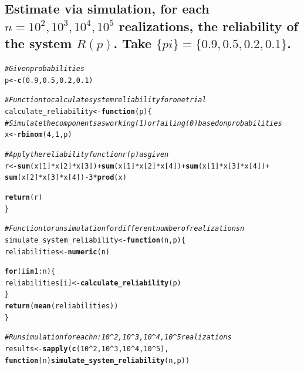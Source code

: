 \documentclass[12pt]{article}\usepackage[]{graphicx}\usepackage[]{xcolor}
\makeatletter
\newcommand{\hlnum}[1]{\textcolor[rgb]{0.686,0.059,0.569}{#1}}%
\newcommand{\hlcom}[1]{\textcolor[rgb]{0.678,0.584,0.686}{\textit{#1}}}%
\newcommand{\hlopt}[1]{\textcolor[rgb]{0,0,0}{#1}}%
\newcommand{\hldef}[1]{\textcolor[rgb]{0.345,0.345,0.345}{#1}}%
\newcommand{\hlkwa}[1]{\textcolor[rgb]{0.161,0.373,0.58}{\textbf{#1}}}%
\newcommand{\hlkwb}[1]{\textcolor[rgb]{0.69,0.353,0.396}{#1}}%
\newcommand{\hlkwc}[1]{\textcolor[rgb]{0.333,0.667,0.333}{#1}}%
\newcommand{\hlkwd}[1]{\textcolor[rgb]{0.737,0.353,0.396}{\textbf{#1}}}%
\newenvironment{kframe}{%
 \def\at@end@of@kframe{}%
 \ifinner\ifhmode%
  \def\at@end@of@kframe{\end{minipage}}%
  \begin{minipage}{\columnwidth}%
 \fi\fi%
 \def\FrameCommand##1{\hskip\@totalleftmargin \hskip-\fboxsep
 \colorbox{shadecolor}{##1}\hskip-\fboxsep
     \hskip-\linewidth \hskip-\@totalleftmargin \hskip\columnwidth}%
 \MakeFramed {\advance\hsize-\width
   \@totalleftmargin\z@ \linewidth\hsize
   \@setminipage}}%
 {\par\unskip\endMakeFramed%
 \at@end@of@kframe}
\newenvironment{knitrout}{}{} %
\makeatother
\begin{document}
\subsection{Estimate via simulation, for each $n = 10^{2} , 10^{3} , 10^{4} , 10^{5}$ realizations, the reliability of the system $R(p)$. Take $\{pi \} = \{0.9, 0.5, 0.2, 0.1\}$.}
\begin{knitrout}
\color{fgcolor}\begin{kframe}
\begin{alltt}
\hlcom{# Given probabilities}
\hldef{p} \hlkwb{<-} \hlkwd{c}\hldef{(}\hlnum{0.9}\hldef{,} \hlnum{0.5}\hldef{,} \hlnum{0.2}\hldef{,} \hlnum{0.1}\hldef{)}

\hlcom{# Function to calculate system reliability for one trial}
\hldef{calculate_reliability} \hlkwb{<-} \hlkwa{function}\hldef{(}\hlkwc{p}\hldef{) \{}
  \hlcom{# Simulate the components as working (1) or failing (0) based on probabilities}
  \hldef{x} \hlkwb{<-} \hlkwd{rbinom}\hldef{(}\hlnum{4}\hldef{,} \hlnum{1}\hldef{, p)}

  \hlcom{# Apply the reliability function r(p) as given}
  \hldef{r} \hlkwb{<-} \hlkwd{sum}\hldef{(x[}\hlnum{1}\hldef{]}\hlopt{*}\hldef{x[}\hlnum{2}\hldef{]}\hlopt{*}\hldef{x[}\hlnum{3}\hldef{])} \hlopt{+} \hlkwd{sum}\hldef{(x[}\hlnum{1}\hldef{]}\hlopt{*}\hldef{x[}\hlnum{2}\hldef{]}\hlopt{*}\hldef{x[}\hlnum{4}\hldef{])} \hlopt{+} \hlkwd{sum}\hldef{(x[}\hlnum{1}\hldef{]}\hlopt{*}\hldef{x[}\hlnum{3}\hldef{]}\hlopt{*}\hldef{x[}\hlnum{4}\hldef{])} \hlopt{+}
              \hlkwd{sum}\hldef{(x[}\hlnum{2}\hldef{]}\hlopt{*}\hldef{x[}\hlnum{3}\hldef{]}\hlopt{*}\hldef{x[}\hlnum{4}\hldef{])} \hlopt{-} \hlnum{3} \hlopt{*} \hlkwd{prod}\hldef{(x)}

  \hlkwd{return}\hldef{(r)}
\hldef{\}}

\hlcom{# Function to run simulation for different number of realizations n}
\hldef{simulate_system_reliability} \hlkwb{<-} \hlkwa{function}\hldef{(}\hlkwc{n}\hldef{,} \hlkwc{p}\hldef{) \{}
  \hldef{reliabilities} \hlkwb{<-} \hlkwd{numeric}\hldef{(n)}

  \hlkwa{for} \hldef{(i} \hlkwa{in} \hlnum{1}\hlopt{:}\hldef{n) \{}
    \hldef{reliabilities[i]} \hlkwb{<-} \hlkwd{calculate_reliability}\hldef{(p)}
  \hldef{\}}
  \hlkwd{return}\hldef{(}\hlkwd{mean}\hldef{(reliabilities))}
\hldef{\}}

\hlcom{# Run simulation for each n: 10^2, 10^3, 10^4, 10^5 realizations}
\hldef{results} \hlkwb{<-} \hlkwd{sapply}\hldef{(}\hlkwd{c}\hldef{(}\hlnum{10}\hlopt{^}\hlnum{2}\hldef{,} \hlnum{10}\hlopt{^}\hlnum{3}\hldef{,} \hlnum{10}\hlopt{^}\hlnum{4}\hldef{,} \hlnum{10}\hlopt{^}\hlnum{5}\hldef{),}
            \hlkwa{function}\hldef{(}\hlkwc{n}\hldef{)} \hlkwd{simulate_system_reliability}\hldef{(n, p))}


\end{alltt}
\end{kframe}
\end{knitrout}
\end{document}
